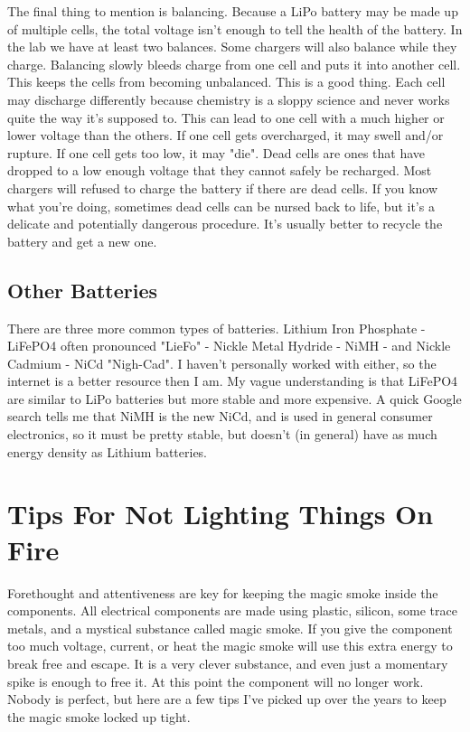 The final thing to mention is balancing. Because a LiPo battery may be made up of multiple cells, the total voltage isn't enough to tell the health of the battery. In the lab we have at least two balances. Some chargers will also balance while they charge. Balancing slowly bleeds charge from one cell and puts it into another cell. This keeps the cells from becoming unbalanced. This is a good thing. Each cell may discharge differently because chemistry is a sloppy science and never works quite the way it's supposed to. This can lead to one cell with a much higher or lower voltage than the others. If one cell gets overcharged, it may swell and/or rupture. If one cell gets too low, it may "die". Dead cells are ones that have dropped to a low enough voltage that they cannot safely be recharged. Most chargers will refused to charge the battery if there are dead cells. If you know what you're doing, sometimes dead cells can be nursed back to life, but it's a delicate and potentially dangerous procedure. It's usually better to recycle the battery and get a new one.

\subsection{Other Batteries}

There are three more common types of batteries. Lithium Iron Phosphate - LiFePO4 often pronounced "LieFo" - Nickle Metal Hydride - NiMH - and Nickle Cadmium - NiCd "Nigh-Cad". I haven't personally worked with either, so the internet is a better resource then I am. My vague understanding is that LiFePO4 are similar to LiPo batteries but more stable and more expensive. A quick Google search tells me that NiMH is the new NiCd, and is used in general consumer electronics, so it must be pretty stable, but doesn't (in general) have as much energy density as Lithium batteries.

\section{Tips For Not Lighting Things On Fire}

Forethought and attentiveness are key for keeping the magic smoke inside the components. All electrical components are made using plastic, silicon, some trace metals, and a mystical substance called magic smoke. If you give the component too much voltage, current, or heat the magic smoke will use this extra energy to break free and escape. It is a very clever substance, and even just a momentary spike is enough to free it. At this point the component will no longer work. Nobody is perfect, but here are a few tips I've picked up over the years to keep the magic smoke locked up tight.

